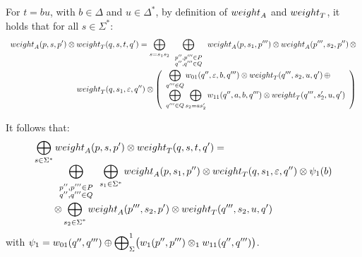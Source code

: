\noindent
For $t = b u$, with $b \in \Delta$ and $u \in \Delta^*$,
by definition of $\weight_A$ and $\weight_T$,
it holds that for all $s \in \Sigma^*$:
\[
\begin{array}{l}
\displaystyle\weight_A(p, s, p') \otimes \weight_T(q, s, t, q') = 
\bigoplus_{s = s_1 s_2}
\displaystyle\bigoplus_{\begin{array}{c}
                        \scriptstyle p'', p''' \in P\\[-1ex]
                        \scriptstyle q'', q''' \in Q
                        \end{array}}
\weight_A(p, s_1, p''') \otimes \weight_A(p''', s_2, p'') \mathop\otimes \\
\hfill\displaystyle
\weight_T(q, s_1, \varepsilon, q'') \otimes
 \left(
 \begin{array}{l}
 \displaystyle
 \bigoplus_{q''' \in Q}
 \wei_{01}(q'', \varepsilon, b, q''') \otimes \weight_T(q''', s_2, u, q')
 \mathop\oplus\\
 \displaystyle
 \bigoplus_{q''' \in Q} \bigoplus_{s_2 = a s'_2}
 \wei_{11}(q'', a, b, q''') \otimes \weight_T(q''', s'_2, u, q')
 \end{array}
 \right)
\end{array}
\]

\noindent
It follows that:
\[
\begin{array}{l}
\displaystyle\bigoplus_{s \in \Sigma^*} 
\displaystyle\weight_A(p, s, p') \otimes \weight_T(q, s, t, q') = \\
\qquad
\displaystyle\bigoplus_{\begin{array}{c}
                        \scriptstyle p'', p''' \in P\\[-1ex]
                        \scriptstyle q'', q''' \in Q
                        \end{array}}
\bigoplus_{s_1 \in \Sigma^*}
\weight_A(p, s_1, p'') \otimes \weight_T(q, s_1, \varepsilon, q'') \otimes \psi_1(b)\\
\qquad
\otimes\displaystyle\bigoplus_{\scriptstyle s_2 \in \Sigma^*}
\weight_A(p''', s_2, p') \otimes \weight_T(q''', s_2, u, q')
\end{array}
\]
with 
$\psi_1 = \wei_{01}(q'', q''') \oplus
\displaystyle{\bigoplus}_\Sigma^1 \bigl(\wei_1(p'', p''') 
 \otimes_1 \wei_{11}(q'', q''')\bigr)$.

